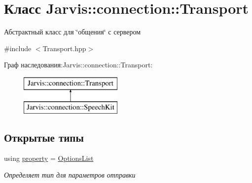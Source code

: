 \hypertarget{classJarvis_1_1connection_1_1Transport}{}\section{Класс Jarvis\+:\+:connection\+:\+:Transport}
\label{classJarvis_1_1connection_1_1Transport}


Абстрактный класс для \char`\"{}общения\char`\"{} с сервером  




{\ttfamily \#include $<$Transport.\+hpp$>$}

Граф наследования\+:Jarvis\+:\+:connection\+:\+:Transport\+:\begin{figure}[H]
\begin{center}
\leavevmode
\includegraphics[height=2.000000cm]{classJarvis_1_1connection_1_1Transport}
\end{center}
\end{figure}
\subsection*{Открытые типы}
\begin{DoxyCompactItemize}
\item 
using \hyperlink{classJarvis_1_1connection_1_1Transport_a81b1e5dc6c0a246fa2a225a1ff185b95}{property} = \hyperlink{classJarvis_1_1connection_1_1Transport_a2cb5e9e28fa84404e8b002c65fe8ecd0}{Options\+List}
\begin{DoxyCompactList}\small\item\em Определяет тип для параметров отправки \end{DoxyCompactList}\end{DoxyCompactItemize}
